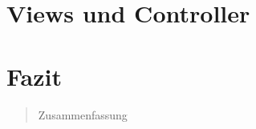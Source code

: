 \documentclass[a4paper, abstracton]{scrartcl}
\begin{document}
\section{Views und Controller}

\section{Fazit}

\begin{abstract}
Zusammenfassung
\end{abstract}
\pagebreak
\tableofcontents	%
\pagebreak
\listoffigures		%

\pagebreak	%


\pagebreak


\pagebreak	
\end{document}
